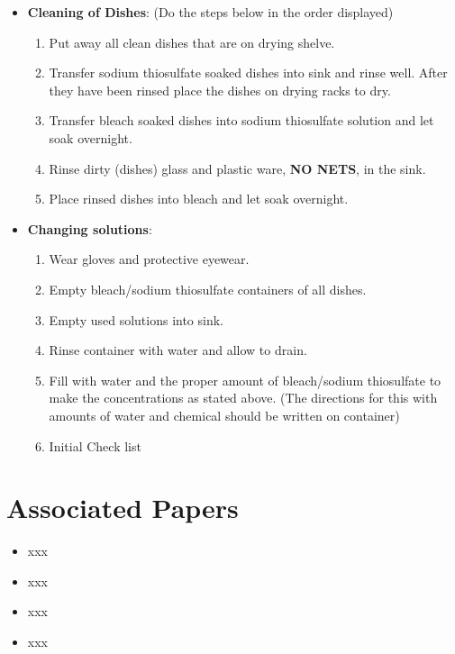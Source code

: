 \documentclass[
  letterpaper,
  DIV=11,
  numbers=noendperiod]{scrreprt}
\providecommand{\tightlist}{%
  \setlength{\itemsep}{0pt}\setlength{\parskip}{0pt}}\usepackage{longtable,booktabs,array}
\begin{document}
\begin{itemize}
\item
  \textbf{Cleaning of Dishes}: (Do the steps below in the order
  displayed)

  \begin{enumerate}
  \def\labelenumi{\arabic{enumi}.}
  \tightlist
  \item
    Put away all clean dishes that are on drying shelve.
  \item
    Transfer sodium thiosulfate soaked dishes into sink and rinse well.
    After they have been rinsed place the dishes on drying racks to dry.
  \item
    Transfer bleach soaked dishes into sodium thiosulfate solution and
    let soak overnight.
  \item
    Rinse dirty (dishes) glass and plastic ware, \textbf{NO NETS}, in
    the sink.
  \item
    Place rinsed dishes into bleach and let soak overnight.
  \end{enumerate}
\item
  \textbf{Changing solutions}:

  \begin{enumerate}
  \def\labelenumi{\arabic{enumi}.}
  \tightlist
  \item
    Wear gloves and protective eyewear.
  \item
    Empty bleach/sodium thiosulfate containers of all dishes.
  \item
    Empty used solutions into sink.
  \item
    Rinse container with water and allow to drain.
  \item
    Fill with water and the proper amount of bleach/sodium thiosulfate
    to make the concentrations as stated above. (The directions for this
    with amounts of water and chemical should be written on container)
  \item
    Initial Check list
  \end{enumerate}
\end{itemize}

\hypertarget{associated-papers-4}{%
\section{Associated Papers}\label{associated-papers-4}}

\begin{itemize}
\tightlist
\item
  xxx
\item
  xxx
\item
  xxx
\item
  xxx
\end{itemize}
\end{document}
